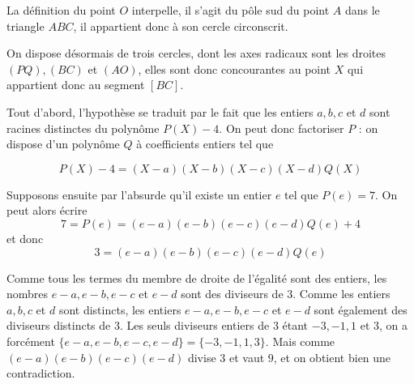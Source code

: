 \begin{sol}
\begin{center}
\end{center}

La définition du point $O$ interpelle, il s'agit du pôle sud du point $A$ dans le triangle $ABC$, il appartient donc à son cercle circonscrit.

On dispose désormais de trois cercles, dont les axes radicaux sont les droites $(PQ), (BC)$ et $(AO)$, elles sont donc concourantes au point $X$ qui appartient donc au segment $[BC]$.
\end{sol}


\begin{sol}
Tout d'abord, l'hypothèse se traduit par le fait que les entiers $a,b,c$ et $d$ sont racines distinctes du polynôme $P(X)-4$. On peut donc factoriser $P$ : on dispose d'un polynôme $Q$ à coefficients entiers tel que 

\[P(X)-4= (X-a)(X-b)(X-c)(X-d)Q(X)\]

Supposons ensuite par l'absurde qu'il existe un entier $e$ tel que $P(e)=7$. On peut alors écrire
$$7=P(e)=(e-a)(e-b)(e-c)(e-d)Q(e) +4$$
et donc
$$3=(e-a)(e-b)(e-c)(e-d)Q(e)$$

Comme tous les termes du membre de droite de l'égalité sont des entiers, les nombres $e-a,e-b,e-c$ et $e-d$ sont des diviseurs de $3$. Comme les entiers $a,b,c$ et $d$ sont distincts, les entiers $e-a,e-b,e-c$ et $e-d$ sont également des diviseurs distincts de $3$. Les seuls diviseurs entiers de $3$ étant $-3,-1,1$ et $3$, on a forcément $\{e-a,e-b,e-c,e-d\}=\{-3,-1,1,3\}$. Mais comme $(e-a)(e-b)(e-c)(e-d)$ divise $3$ et vaut $9$, et on obtient bien une contradiction.
\end{sol}


